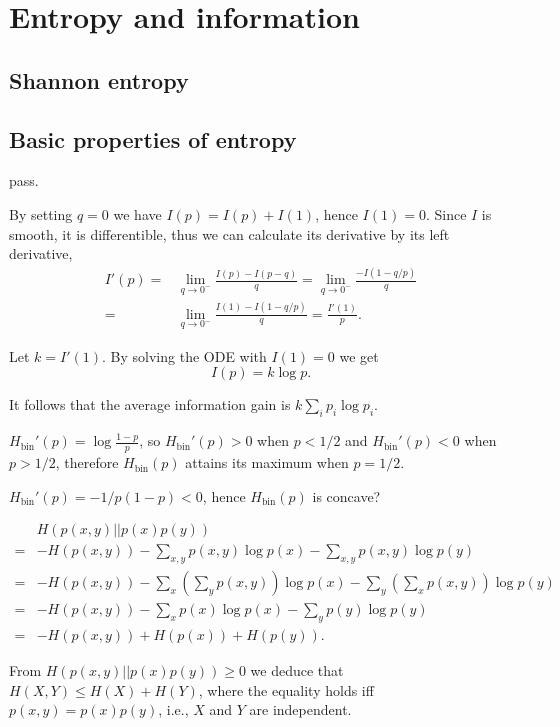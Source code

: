 \chapter{Entropy and information}

\section{Shannon entropy}

\section{Basic properties of entropy}

\ex pass.

\ex By setting $q=0$ we have $I(p)=I(p)+I(1)$, hence $I(1) = 0$.
Since $I$ is smooth, it is differentible, thus we can calculate its derivative by its left derivative,
$$\begin{aligned}
    I'(p) = & \lim_{q\rightarrow 0^-}\frac{I(p) - I(p - q)}{q} = \lim_{q\rightarrow 0^-}\frac{-I(1-q/p)}{q}
    \\ = & \lim_{q\rightarrow 0^-}\frac{I(1) - I(1-q/p)}{q} = \frac{I'(1)}{p}.
\end{aligned}$$

Let $k=I'(1)$.
By solving the ODE with $I(1) = 0$ we get
$$I(p) = k\log p.$$

It follows that the average information gain is $k\sum_ip_i\log p_i$.

\ex $H_{\text{bin}}'(p) = \log\frac{1-p}{p}$, so $H_{\text{bin}}'(p)>0$ when $p<1/2$ and $H_{\text{bin}}'(p)<0$ when $p>1/2$, therefore $H_{\text{bin}}(p)$ attains its maximum when $p=1/2$.

\ex $H_{\text{bin}}'(p)=-1/p(1-p)<0$, hence $H_{\text{bin}}(p)$ is concave?

\ex $$\begin{aligned}
& H(p(x,y)||p(x)p(y))
\\ = & -H(p(x,y)) - \sum_{x,y}p(x,y)\log p(x) - \sum_{x,y} p(x,y)\log p(y)
\\ = & -H(p(x,y)) - \sum_x(\sum_y p(x,y))\log p(x) - \sum_y(\sum_x p(x,y))\log p(y)
\\ = & -H(p(x,y)) - \sum_xp(x)\log p(x) - \sum_yp(y)\log p(y)
\\ = & -H(p(x,y)) + H(p(x)) + H(p(y)).
\end{aligned}$$

From $H(p(x,y)||p(x)p(y))\ge 0$ we deduce that $H(X,Y) \le H(X) + H(Y)$, where the equality holds iff $p(x,y)=p(x)p(y)$, i.e., $X$ and $Y$ are independent.


